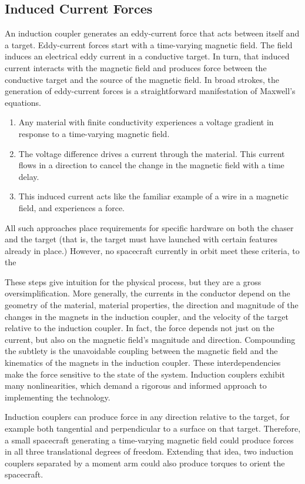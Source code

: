 \subsection{Induced Current Forces}

An induction coupler generates an eddy-current force that acts between itself and a target. Eddy-current forces start with a time-varying magnetic field. The field induces an electrical eddy current in a conductive target. In turn, that induced current interacts with the magnetic field and produces force between the conductive target and the source of the magnetic field.
In broad strokes, the generation of eddy-current forces is a straightforward manifestation of Maxwell's
equations.
‎
\begin{enumerate}
\item Any material with finite conductivity experiences a voltage gradient in response to a time-varying magnetic field.
\item The voltage difference drives a current through the material. This current flows in a direction to cancel the change in the magnetic field with a time delay.
\item This induced current acts like the familiar example of a wire in a magnetic field, and experiences a force.
\end{enumerate}
 
All such approaches place requirements for specific hardware on both the chaser and the target (that is, the target must have launched with certain features already in place.) However, no spacecraft currently in orbit meet these criteria, to the

These steps give intuition for the physical process, but they are a gross oversimplification. More generally, the currents in the conductor depend on the geometry of the material, material properties, the direction and magnitude of the changes in the magnets in the induction coupler, and the velocity of the target relative to the induction coupler. In fact, the force depends not just on the current, but also on the magnetic field's magnitude and direction. Compounding the subtlety is the unavoidable coupling between the magnetic field and the kinematics of the magnets in the induction coupler. These interdependencies make the force sensitive to the state of the system. Induction couplers exhibit many nonlinearities, which demand a rigorous and informed approach to implementing the technology.

Induction couplers can produce force in any direction relative to the target, for example both tangential and perpendicular to a surface on that target. Therefore, a small spacecraft generating a time-varying magnetic field could produce forces in all three translational degrees of freedom. Extending that idea, two induction couplers separated by a moment arm could also produce torques to orient the spacecraft.

